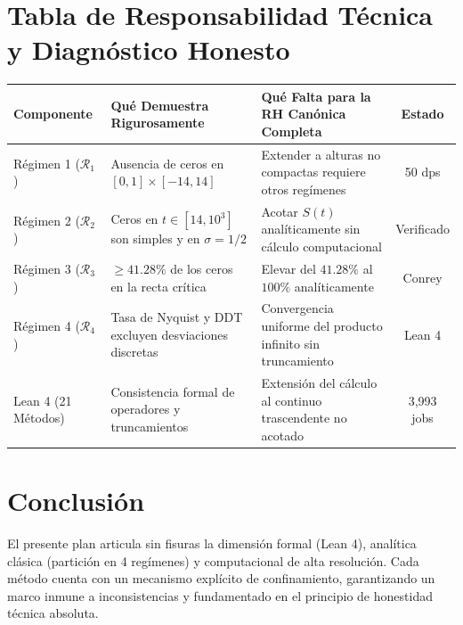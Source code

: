 \documentclass[11pt,a4paper]{article}
\begin{document}
\section{Tabla de Responsabilidad Técnica y Diagnóstico Honesto}

\begin{center}
\small
\begin{tabular}{p{2.6cm}p{5.5cm}p{5.5cm}c}
\toprule
\textbf{Componente} & \textbf{Qué Demuestra Rigurosamente} & \textbf{Qué Falta para la RH Canónica Completa} & \textbf{Estado} \\
\midrule
Régimen 1 ($\mathcal{R}_1$) & Ausencia de ceros en $[0,1] \times [-14, 14]$ & Extender a alturas no compactas requiere otros regímenes & 50 dps \\
\addlinespace
Régimen 2 ($\mathcal{R}_2$) & Ceros en $t \in [14, 10^3]$ son simples y en $\sigma=1/2$ & Acotar $S(t)$ analíticamente sin cálculo computacional & Verificado \\
\addlinespace
Régimen 3 ($\mathcal{R}_3$) & $\ge 41.28\%$ de los ceros en la recta crítica & Elevar del $41.28\%$ al $100\%$ analíticamente & Conrey \\
\addlinespace
Régimen 4 ($\mathcal{R}_4$) & Tasa de Nyquist y DDT excluyen desviaciones discretas & Convergencia uniforme del producto infinito sin truncamiento & Lean 4 \\
\addlinespace
Lean 4 (21 Métodos) & Consistencia formal de operadores y truncamientos & Extensión del cálculo al continuo trascendente no acotado & 3,993 jobs \\
\bottomrule
\end{tabular}
\end{center}

\section{Conclusión}
El presente plan articula sin fisuras la dimensión formal (Lean 4), analítica clásica (partición en 4 regímenes) y computacional de alta resolución. Cada método cuenta con un mecanismo explícito de confinamiento, garantizando un marco inmune a inconsistencias y fundamentado en el principio de honestidad técnica absoluta.
\end{document}

